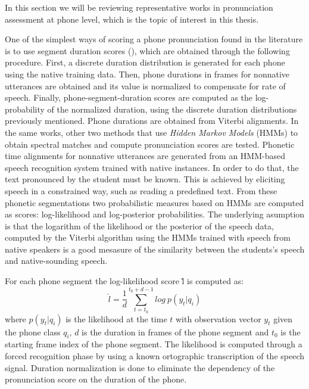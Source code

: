 In this section we will be reviewing representative works in pronunciation assessment
at phone level, which is the topic of interest in this thesis.

One of the simplest ways of scoring a phone pronunciation found in the literature 
is to use segment duration scores (\cite{pronunciation_scoring_instruction, pronunciation_scoring_phone_segments_instruction}), which are obtained through the following
procedure. First, a discrete duration distribution is generated for each phone
using the native training data. 
Then, phone durations in frames for nonnative utterances are obtained 
and its value is normalized to compensate for rate of speech. 
Finally, phone-segment-duration scores are computed as 
the log-probability of the normalized duration, using the discrete duration 
distributions previously mentioned. Phone durations are obtained from Viterbi alignments.
In the same works, other two methods that use \textit{Hidden Markov Models} (HMMs) to obtain 
spectral matches and compute pronunciation scores are tested. 
Phonetic time alignments for
nonnative utterances are generated from an HMM-based speech recognition system trained
with native instances. In order to do that, the text pronounced by the student 
must be known. This is achieved by eliciting speech in a
constrained way, such as reading a predefined text.
From these phonetic segmentations two 
probabilistic measures based on HMMs are computed as scores: log-likelihood and 
log-posterior probabilities. The underlying asumption is that the logarithm of the likelihood
or the posterior of the speech data, computed by the Viterbi 
algorithm using the HMMs trained with speech from native
speakers is a good mesasure of the similarity between the students's
speech and native-sounding speech.

For each phone segment the log-likelihood score \^{l} is computed as:
\begin{equation}
\label{eq:logLikelihood}
\hat{l} = \frac{1}{d} \sum_{t=t_{0}}^{t_{0}+d-1} log \ p(y_{t}|q_{i})
\end{equation}
where $p(y_{t}|q_{i})$ is the likelihood at the time $t$ with observation vector $y_{t}$
given the phone class $q_{i}$, $d$ is the duration in frames of the phone segment 
and $t_{0}$ is the starting frame index of the phone segment. 
The likelihood is computed through a forced recognition phase by using a known ortographic
transcription of the speech signal. Duration normalization is done to 
eliminate the dependency of the pronunciation score on the duration of the phone.

